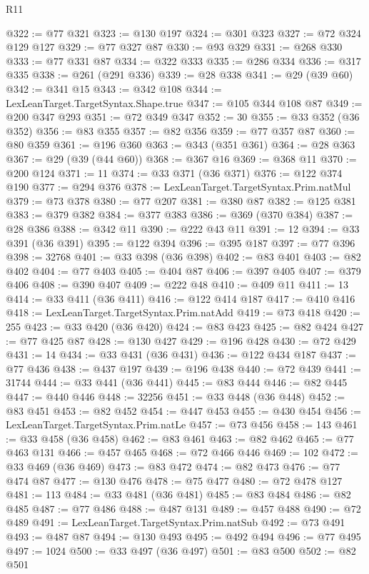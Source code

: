 \begin{lexlean}{R11}
\begin{coremodule}
@322 := @77 @321
@323 := @130 @197
@324 := @301 @323
@327 := @72 @324 @129 @127
@329 := @77 @327 @87
@330 := @93 @329
@331 := @268 @330
@333 := @77 @331 @87
@334 := @322 @333
@335 := @286 @334
@336 := @317 @335
@338 := @261 (@291 @336)
@339 := @28 @338
@341 := @29 (@39 @60)
@342 := @341 @15
@343 := @342 @108
@344 := LexLeanTarget.TargetSyntax.Shape.true
@347 := @105 @344 @108 @87
@349 := @200 @347 @293
@351 := @72 @349 @347
@352 := 30
@355 := @33 @352 (@36 @352)
@356 := @83 @355
@357 := @82 @356
@359 := @77 @357 @87
@360 := @80 @359
@361 := @196 @360
@363 := @343 (@351 @361)
@364 := @28 @363
@367 := @29 (@39 (@44 @60))
@368 := @367 @16
@369 := @368 @11
@370 := @200 @124
@371 := 11
@374 := @33 @371 (@36 @371)
@376 := @122 @374 @190
@377 := @294 @376
@378 := LexLeanTarget.TargetSyntax.Prim.natMul
@379 := @73 @378
@380 := @77 @207
@381 := @380 @87
@382 := @125 @381
@383 := @379 @382
@384 := @377 @383
@386 := @369 (@370 @384)
@387 := @28 @386
@388 := @342 @11
@390 := @222 @43 @11
@391 := 12
@394 := @33 @391 (@36 @391)
@395 := @122 @394
@396 := @395 @187
@397 := @77 @396
@398 := 32768
@401 := @33 @398 (@36 @398)
@402 := @83 @401
@403 := @82 @402
@404 := @77 @403
@405 := @404 @87
@406 := @397 @405
@407 := @379 @406
@408 := @390 @407
@409 := @222 @48
@410 := @409 @11
@411 := 13
@414 := @33 @411 (@36 @411)
@416 := @122 @414 @187
@417 := @410 @416
@418 := LexLeanTarget.TargetSyntax.Prim.natAdd
@419 := @73 @418
@420 := 255
@423 := @33 @420 (@36 @420)
@424 := @83 @423
@425 := @82 @424
@427 := @77 @425 @87
@428 := @130 @427
@429 := @196 @428
@430 := @72 @429
@431 := 14
@434 := @33 @431 (@36 @431)
@436 := @122 @434 @187
@437 := @77 @436
@438 := @437 @197
@439 := @196 @438
@440 := @72 @439
@441 := 31744
@444 := @33 @441 (@36 @441)
@445 := @83 @444
@446 := @82 @445
@447 := @440 @446
@448 := 32256
@451 := @33 @448 (@36 @448)
@452 := @83 @451
@453 := @82 @452
@454 := @447 @453
@455 := @430 @454
@456 := LexLeanTarget.TargetSyntax.Prim.natLe
@457 := @73 @456
@458 := 143
@461 := @33 @458 (@36 @458)
@462 := @83 @461
@463 := @82 @462
@465 := @77 @463 @131
@466 := @457 @465
@468 := @72 @466 @446
@469 := 102
@472 := @33 @469 (@36 @469)
@473 := @83 @472
@474 := @82 @473
@476 := @77 @474 @87
@477 := @130 @476
@478 := @75 @477
@480 := @72 @478 @127
@481 := 113
@484 := @33 @481 (@36 @481)
@485 := @83 @484
@486 := @82 @485
@487 := @77 @486
@488 := @487 @131
@489 := @457 @488
@490 := @72 @489
@491 := LexLeanTarget.TargetSyntax.Prim.natSub
@492 := @73 @491
@493 := @487 @87
@494 := @130 @493
@495 := @492 @494
@496 := @77 @495
@497 := 1024
@500 := @33 @497 (@36 @497)
@501 := @83 @500
@502 := @82 @501

\end{coremodule}
\end{lexlean}
